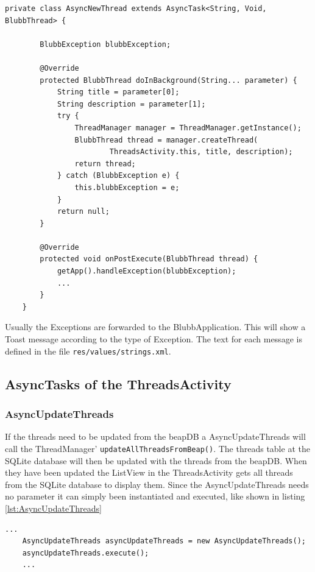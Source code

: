 \documentclass[12pt,a4paper,oneside]{report}
\newcommand{\beapDB}{beapDB}
\newcommand{\code}[1]{\lstinline{#1}}
\begin{document}
\begin{lstlisting}[caption=Exception handling in AsyncTasks, label=lst:Exception]
private class AsyncNewThread extends AsyncTask<String, Void, BlubbThread> {
        
        BlubbException blubbException;

        @Override
        protected BlubbThread doInBackground(String... parameter) {
            String title = parameter[0];
            String description = parameter[1];
            try {
            	ThreadManager manager = ThreadManager.getInstance();
            	BlubbThread thread = manager.createThread(
                        ThreadsActivity.this, title, description);
                return thread;
            } catch (BlubbException e) {
                this.blubbException = e;
            }
            return null;
        }
        
        @Override
        protected void onPostExecute(BlubbThread thread) {
            getApp().handleException(blubbException);
        	...
        }
	}
\end{lstlisting}

Usually the Exceptions are forwarded to the BlubbApplication. This will show a Toast message according to the type of Exception. The text for each message is defined in the file \code{res/values/strings.xml}.

\subsection{AsyncTasks of the ThreadsActivity}

\subsubsection{AsyncUpdateThreads}
\label{AsyncUpdateThreads}

If the threads need to be updated from the \beapDB{} a AsyncUpdateThreads will call the ThreadManager' \code{updateAllThreadsFromBeap()}. The threads table at the SQLite database will then be updated with the threads from the beapDB. When they have been updated the ListView in the ThreadsActivity gets all threads from the SQLite database to display them.
Since the AsyncUpdateThreads needs no parameter it can simply been instantiated and executed, like shown in listing \ref{lst:AsyncUpdateThreads}

\begin{lstlisting}[caption=AsyncUpdateThreads, label=lst:AsyncUpdateThreads]
	...
	AsyncUpdateThreads asyncUpdateThreads = new AsyncUpdateThreads();
	asyncUpdateThreads.execute();
	...
\end{lstlisting}
\end{document}
